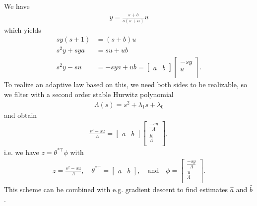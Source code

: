 \documentclass[]{article}
\begin{document}
\subsection{}
We have
\begin{equation}\begin{aligned}
y = \frac{s+b}{s(s+a)}u
\end{aligned}\end{equation}
which yields
\begin{equation}\begin{aligned}
sy(s+1) &= (s+b) u \\
s^2 y + sya &= su + ub \\
s^2y - su &= - sya + ub =
\begin{bmatrix} a & b \end{bmatrix}
\begin{bmatrix} -sy \\ u \\ \end{bmatrix}.
\end{aligned}\end{equation}
To realize an adaptive law based on this, we need both sides to be realizable, so we filter with a second order stable Hurwitz polynomial
\begin{equation}\begin{aligned}
\Lambda(s) = s^2 + \lambda_1 s + \lambda_0
\end{aligned}\end{equation}
and obtain
\begin{equation}\begin{aligned}
\frac{s^2 - su}{\Lambda} =
\begin{bmatrix} a & b \end{bmatrix}
\begin{bmatrix} \frac{-sy}{\Lambda} \\ \frac{u}{\Lambda} \\ \end{bmatrix},
\end{aligned}\end{equation}
i.e. we have $z = \theta^{*\top} \phi$ with
\begin{equation}\begin{aligned}
z = \frac{s^2 - su}{\Lambda}, \quad
\theta^{*\top} =
\begin{bmatrix} a & b \end{bmatrix}, \quad \text{and} \quad
\phi =
\begin{bmatrix} \frac{-sy}{\Lambda} \\ \frac{u}{\Lambda} \\ \end{bmatrix}.
\end{aligned}\end{equation}
This scheme can be combined with e.g. gradient descent to find estimates $\hat a$ and $\hat b$.
\end{document}
